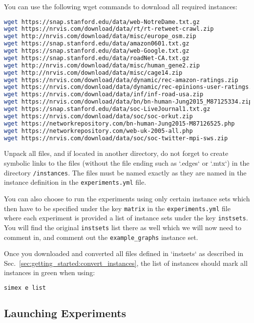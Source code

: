 \documentclass[11pt, a4paper]{scrartcl}
\newcommand{\expfile}{\texttt{experiments.yml} file\xspace}
\begin{document}
You can use the following wget commands to download all required instances:

\begin{lstlisting}[language=bash]
wget https://snap.stanford.edu/data/web-NotreDame.txt.gz
wget https://nrvis.com/download/data/rt/rt-retweet-crawl.zip
wget http://nrvis.com/download/data/misc/europe_osm.zip
wget https://snap.stanford.edu/data/amazon0601.txt.gz
wget https://snap.stanford.edu/data/web-Google.txt.gz
wget https://snap.stanford.edu/data/roadNet-CA.txt.gz
wget http://nrvis.com/download/data/misc/human_gene2.zip
wget http://nrvis.com/download/data/misc/cage14.zip
wget https://nrvis.com/download/data/dynamic/rec-amazon-ratings.zip
wget https://nrvis.com/download/data/dynamic/rec-epinions-user-ratings.zip
wget https://nrvis.com/download/data/inf/inf-road-usa.zip
wget https://nrvis.com/download/data/bn/bn-human-Jung2015_M87125334.zip
wget https://snap.stanford.edu/data/soc-LiveJournal1.txt.gz
wget https://nrvis.com/download/data/soc/soc-orkut.zip
wget https://networkrepository.com/bn-human-Jung2015-M87126525.php
wget https://networkrepository.com/web-uk-2005-all.php
wget https://nrvis.com/download/data/soc/soc-twitter-mpi-sws.zip
\end{lstlisting}

Unpack all files, and if located in another directory,  do not forget to create
symbolic links to the files (without the file ending such as `.edges` or `.mtx`)
in the directory \texttt{/instances}. The files must be named exactly as they
are named in the instance definition in the \expfile.

You can also choose to run the experiments using only certain instance sets
which then have to be specified under the key \texttt{matrix} in the \expfile
where each experiment is provided a list of instance sets under the key
\texttt{instsets}. You will find the original \texttt{instsets} list there as
well which we will now need to comment in, and comment out the
\texttt{example\_graphs} instance set.

Once you downloaded and converted all files defined in `instsets` as described
in Sec.~\ref{sec:getting_started:convert_instances}, the list of instances
should mark all instances in green when using:

\begin{lstlisting}[language=bash]
simex e list
\end{lstlisting}

\subsection{Launching Experiments}
\end{document}
